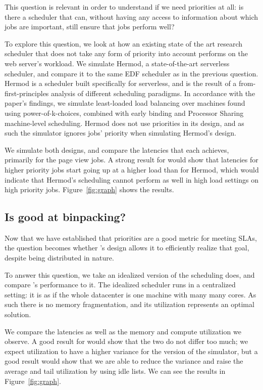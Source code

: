 This question is relevant in order to understand if we need priorities at all:
is there a scheduler that can, without having any access to information about
which jobs are important, still ensure that jobs perform well?

To explore this question, we look at how an existing state of the art research
scheduler that does not take any form of priority into account performs on the
web server's workload. We simulate Hermod\cite{TODO}, a state-of-the-art
serverless scheduler, and compare it to the same EDF scheduler as in the
previous question. Hermod is a scheduler built specifically for serverless, and
is the result of a from-first-principles analysis of different scheduling
paradigms. In accordance with the paper's findings, we simulate least-loaded
load balancing over machines found using power-of-k-choices, combined with early
binding and Processor Sharing machine-level scheduling. Hermod does not use
priorities in its design, and as such the simulator ignores jobs' priority when
simulating Hermod's design.

We simulate both designs, and compare the latencies that each achieves,
primarily for the page view jobs. A strong result for \sys{} would show that
latencies for higher priority jobs start going up at a higher load than for
Hermod, which would indicate that Hermod's scheduling cannot perform as well in
high load settings on high priority jobs. Figure~\ref{fig:graph} shows the
results.


\subsection{Is \sys{} good at binpacking?}

Now that we have established that priorities are a good metric for meeting SLAs,
the question becomes whether \sys{}'s design allows it to efficiently realize
that goal, despite being distributed in nature.

To answer this question, we take an idealized version of the scheduling \sys{}
does, and compare \sys{}'s performance to it. The idealized scheduler runs in a
centralized setting: it is as if the whole datacenter is one machine with many
many cores. As such there is no memory fragmentation, and its utilization
represents an optimal solution.

We compare the latencies as well as the memory and compute utilization we
observe. A good result for \sys{} would show that the two do not differ too
much; we expect utilization to have a higher variance
for the \sys{} version of the simulator, but a good result would show that we
are able to reduce the variance and raise the average and tail utilization by
using idle lists. We can see the results in Figure~\ref{fig:graph}.


